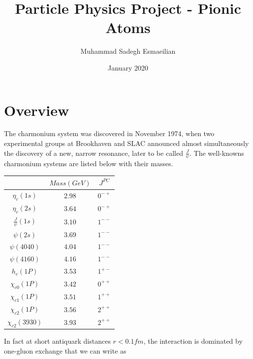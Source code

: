 \documentclass{article}
\title{Particle Physics Project - Pionic Atoms}
\author{Muhammad Sadegh Esmaeilian}
\date{January 2020}
\begin{document}
\maketitle

\section{Overview}
The charmonium system was discovered in November 1974, when two experimental groups at Brookhaven and SLAC announced almost simultaneously the discovery of a new, narrow resonance, later to be called \(\frac{J}{\psi}\).
The well-knowns charmonium systems are listed below with their masses.

\begin{center}
\begin{tabular}{ c | c c }
& $Mass(GeV)$ & $J^{PC}$ \\
\hline 
$\eta_{c}(1s)$ & $2.98$ & $0^{-+}$\\  
$\eta_{c}(2s)$ & $3.64$ & $0^{-+}$\\
$\frac{J}{\psi}(1s)$ & $3.10$ & $1^{--}$\\
$\psi(2s)$ & $3.69$ & $1^{--}$\\
$\psi(4040)$ & $4.04$ & $1^{--}$\\
$\psi(4160)$ & $4.16$ & $1^{--}$\\
$h_{c}(1P)$ & $3.53$ & $1^{+-}$\\
$\chi_{c0}(1P)$ & $3.42$ & $0^{++}$\\
$\chi_{c1}(1P)$ & $3.51$ & $1^{++}$\\
$\chi_{c2}(1P)$ & $3.56$ & $2^{++}$\\
$\chi_{c2}(3930)$ & $3.93$ & $2^{++}$
\end{tabular}
\end{center}

In fact at short antiquark distances \(r < 0.1 fm\), the interaction is dominated by one-gluon exchange that we can write as 
\end{document}
